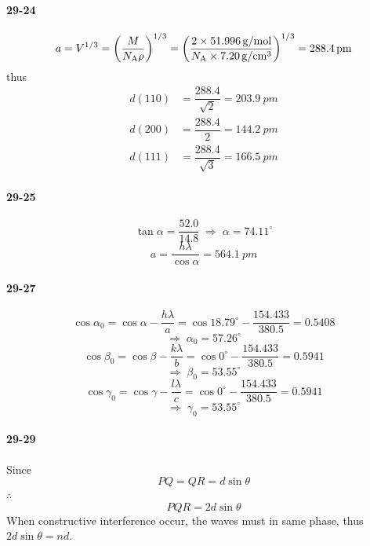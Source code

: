 \documentclass[a4paper]{article}
\newcommand{\NA}{N_\mathrm{A}}
\DeclareMathOperator{\dra}{\Rightarrow}
\newcommand{\ex}[1]{\paragraph{29-#1}}
\numberwithin{equation}{section}
\begin{document}
\ex{24}
\begin{equation}\label{key}
a = V^{1/3} = \qty(\dfrac{M}{\NA \rho})^{1/3} = \qty(\dfrac{2\times \SI{51.996}{g/mol}}{\NA\times \SI{7.20}{g/cm^3}})^{1/3} = \SI{288.4}{pm}
\end{equation}
thus
\begin{align}
d(110) &= \dfrac{288.4}{\sqrt{2}} = \SI{203.9}{pm} \\
d(200) &= \dfrac{288.4}{2} = \SI{144.2}{pm} \\
d(111) &= \dfrac{288.4}{\sqrt{3}} = \SI{166.5}{pm} 
\end{align}

\ex{25}
\begin{equation}\label{key}
\tan \alpha = \dfrac{52.0}{14.8} \;\dra\; \alpha = 74.11^\circ
\end{equation}
\begin{equation}\label{key}
a = \dfrac{h\lambda}{\cos\alpha} = \SI{564.1}{pm}
\end{equation}


\ex{27}
\begin{equation}\label{key}
\cos\alpha_0 = \cos\alpha - \dfrac{h\lambda}{a} = \cos 18.79^\circ - \dfrac{154.433}{380.5} = 0.5408
\end{equation}
\begin{equation}\label{key}
\dra \; \alpha_0 = 57.26^\circ
\end{equation}
\begin{equation}\label{key}
\cos\beta_0 = \cos\beta - \dfrac{k\lambda}{b} = \cos 0^\circ - \dfrac{154.433}{380.5} = 0.5941
\end{equation}
\begin{equation}\label{key}
\dra \; \beta_0 = 53.55^\circ
\end{equation}
\begin{equation}\label{key}
\cos\gamma_0 = \cos\gamma - \dfrac{l\lambda}{c} = \cos 0^\circ - \dfrac{154.433}{380.5} = 0.5941
\end{equation}
\begin{equation}\label{key}
\dra \; \gamma_0 = 53.55^\circ
\end{equation}

\ex{29}
Since
\begin{equation}\label{key}
PQ = QR = d\sin\theta
\end{equation}
$ \therefore $
\begin{equation}\label{key}
PQR = 2d\sin\theta
\end{equation}
When constructive interference occur, the waves must in same phase, thus $ 2d\sin\theta = nd $.
\end{document}
